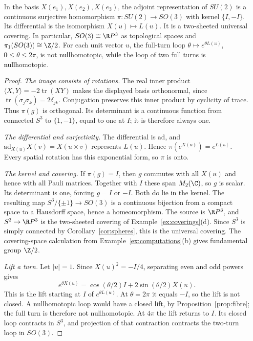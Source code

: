 \begin{theorem}\label{thm:spin}
In the basis $X(e_1),X(e_2),X(e_3)$, the adjoint representation of
$SU(2)$ is a continuous surjective homomorphism
$\pi:SU(2)\to SO(3)$ with kernel $\{I,-I\}$.
Its differential is the isomorphism $X(u)\mapsto L(u)$.
It is a two-sheeted universal covering. In particular,
$SO(3)\cong\R P^3$ as topological spaces and
$\pi_1(SO(3))\cong\Z/2$.
For each unit vector $u$, the full-turn loop
$\theta\mapsto e^{\theta L(u)}$, $0\le\theta\le2\pi$,
is not nullhomotopic, while the loop of two full turns is nullhomotopic.
\end{theorem}
\begin{proof}
\emph{The image consists of rotations.}
The real inner product $\langle X,Y\rangle=-2\operatorname{tr}(XY)$
makes the displayed basis orthonormal, since
$\operatorname{tr}(\sigma_j\sigma_k)=2\delta_{jk}$.
Conjugation preserves this inner product by cyclicity of trace.
Thus $\pi(g)$ is orthogonal. Its determinant is a continuous function
from connected $S^3$ to $\{1,-1\}$, equal to one at $I$;
it is therefore always one.

\emph{The differential and surjectivity.}
The differential is $\mathrm{ad}$, and
$\mathrm{ad}_{X(u)}X(v)=X(u\times v)$ represents $L(u)$.
Hence $\pi(e^{X(u)})=e^{L(u)}$.
Every spatial rotation has this exponential form, so $\pi$ is onto.

\emph{The kernel and covering.}
If $\pi(g)=I$, then $g$ commutes with all $X(u)$ and hence with all
Pauli matrices. Together with $I$ these span $M_2(\C)$, so $g$ is
scalar. Its determinant is one, forcing $g=I$ or $-I$.
Both do lie in the kernel.
The resulting map $S^3/\{\pm1\}\to SO(3)$ is a continuous bijection
from a compact space to a Hausdorff space, hence a homeomorphism.
The source is $\R P^3$, and $S^3\to\R P^3$ is the two-sheeted
covering of Example~\ref{ex:coverings}(d).
Since $S^3$ is simply connected by Corollary~\ref{cor:spheres}, this
is the universal covering. The covering-space calculation from
Example~\ref{ex:computations}(b) gives fundamental group $\Z/2$.

\emph{Lift a turn.}
Let $|u|=1$. Since $X(u)^2=-I/4$, separating even and odd powers gives
\[
 e^{\theta X(u)}=\cos(\theta/2)I+2\sin(\theta/2)X(u).
\]
This is the lift starting at $I$ of $e^{\theta L(u)}$.
At $\theta=2\pi$ it equals $-I$, so the lift is not closed.
A nullhomotopic loop would have a closed lift, by
Proposition~\ref{prop:fibre}; the full turn is therefore not nullhomotopic.
At $4\pi$ the lift returns to $I$. Its closed loop contracts in $S^3$,
and projection of that contraction contracts the two-turn loop in $SO(3)$.
\end{proof}

